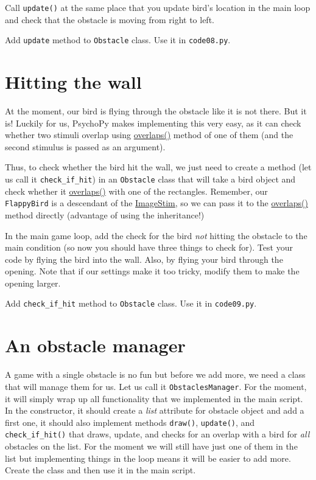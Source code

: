 \documentclass[
]{book}
\begin{document}
Call \texttt{update()} at the same place that you update bird's location in the main loop and check that the obstacle is moving from right to left.

Add \texttt{update} method to \texttt{Obstacle} class.
Use it in \texttt{code08.py}.

\hypertarget{hitting-the-wall}{%
\section{Hitting the wall}\label{hitting-the-wall}}

At the moment, our bird is flying through the obstacle like it is not there. But it is! Luckily for us, PsychoPy makes implementing this very easy, as it can check whether two stimuli overlap using \href{https://psychopy.org/api/visual/shapestim.html\#psychopy.visual.ShapeStim.overlaps}{overlaps()} method of one of them (and the second stimulus is passed as an argument).

Thus, to check whether the bird hit the wall, we just need to create a method (let us call it \texttt{check\_if\_hit}) in an \texttt{Obstacle} class that will take a bird object and check whether it \href{https://psychopy.org/api/visual/shapestim.html\#psychopy.visual.ShapeStim.overlaps}{overlaps()} with one of the rectangles. Remember, our \texttt{FlappyBird} is a descendant of the \href{https://psychopy.org/api/visual/imagestim.html\#psychopy.visual.ImageStim}{ImageStim}, so we can pass it to the \href{https://psychopy.org/api/visual/shapestim.html\#psychopy.visual.ShapeStim.overlaps}{overlaps()} method directly (advantage of using the inheritance!)

In the main game loop, add the check for the bird \emph{not} hitting the obstacle to the main condition (so now you should have three things to check for).
Test your code by flying the bird into the wall. Also, by flying your bird through the opening. Note that if our settings make it too tricky, modify them to make the opening larger.

Add \texttt{check\_if\_hit} method to \texttt{Obstacle} class.
Use it in \texttt{code09.py}.

\hypertarget{an-obstacle-manager}{%
\section{An obstacle manager}\label{an-obstacle-manager}}

A game with a single obstacle is no fun but before we add more, we need a class that will manage them for us. Let us call it \texttt{ObstaclesManager}. For the moment, it will simply wrap up all functionality that we implemented in the main script. In the constructor, it should create a \emph{list} attribute for obstacle object and add a first one, it should also implement methods \texttt{draw()}, \texttt{update()}, and \texttt{check\_if\_hit()} that draws, update, and checks for an overlap with a bird for \emph{all} obstacles on the list. For the moment we will still have just one of them in the list but implementing things in the loop means it will be easier to add more. Create the class and then use it in the main script.
\end{document}
